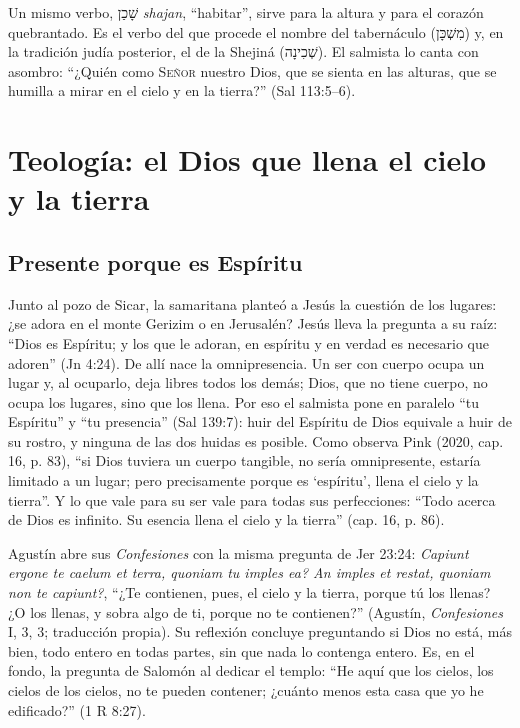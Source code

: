 \documentclass[11pt,letterpaper]{article}
\newcommand{\heb}[1]{\mbox{\foreignlanguage{hebrew}{#1}}}
\newcommand{\SENOR}{\textsc{Señor}}
\begin{document}
Un mismo verbo, \heb{שָׁכַן} \emph{shajan}, ``habitar'', sirve para la altura y para el corazón quebrantado. Es el verbo del que procede el nombre del tabernáculo (\heb{מִשְׁכָּן}) y, en la tradición judía posterior, el de la Shejiná (\heb{שְׁכִינָה}). El salmista lo canta con asombro: ``¿Quién como \SENOR{} nuestro Dios, que se sienta en las alturas, que se humilla a mirar en el cielo y en la tierra?'' (Sal 113:5--6).

\section{Teología: el Dios que llena el cielo y la tierra}

\subsection{Presente porque es Espíritu}

Junto al pozo de Sicar, la samaritana planteó a Jesús la cuestión de los lugares: ¿se adora en el monte Gerizim o en Jerusalén? Jesús lleva la pregunta a su raíz: ``Dios es Espíritu; y los que le adoran, en espíritu y en verdad es necesario que adoren'' (Jn 4:24). De allí nace la omnipresencia. Un ser con cuerpo ocupa un lugar y, al ocuparlo, deja libres todos los demás; Dios, que no tiene cuerpo, no ocupa los lugares, sino que los llena. Por eso el salmista pone en paralelo ``tu Espíritu'' y ``tu presencia'' (Sal 139:7): huir del Espíritu de Dios equivale a huir de su rostro, y ninguna de las dos huidas es posible. Como observa Pink (2020, cap. 16, p. 83), ``si Dios tuviera un cuerpo tangible, no sería omnipresente, estaría limitado a un lugar; pero precisamente porque es `espíritu', llena el cielo y la tierra''. Y lo que vale para su ser vale para todas sus perfecciones: ``Todo acerca de Dios es infinito. Su esencia llena el cielo y la tierra'' (cap. 16, p. 86).

Agustín abre sus \emph{Confesiones} con la misma pregunta de Jer 23:24: \emph{Capiunt ergone te caelum et terra, quoniam tu imples ea? An imples et restat, quoniam non te capiunt?}, ``¿Te contienen, pues, el cielo y la tierra, porque tú los llenas? ¿O los llenas, y sobra algo de ti, porque no te contienen?'' (Agustín, \emph{Confesiones} I, 3, 3; traducción propia). Su reflexión concluye preguntando si Dios no está, más bien, todo entero en todas partes, sin que nada lo contenga entero. Es, en el fondo, la pregunta de Salomón al dedicar el templo: ``He aquí que los cielos, los cielos de los cielos, no te pueden contener; ¿cuánto menos esta casa que yo he edificado?'' (1 R 8:27).
\end{document}
